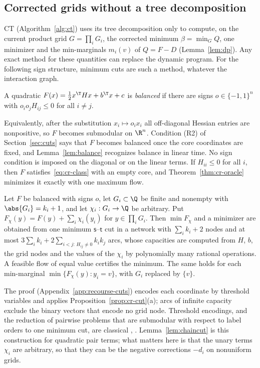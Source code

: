 \subsection{Corrected grids without a tree decomposition}\label{sec:balanced}

CT (Algorithm~\ref{alg:ct}) uses its tree decomposition only to compute, on
the current product grid $G=\prod_iG_i$, the corrected minimum
$\beta=\min_GQ$, one minimizer and the min-marginals $m_i(v)$ of $Q=F-D$
(Lemma~\ref{lem:dp}). Any exact method for these quantities can replace the
dynamic program. For the following sign structure, minimum cuts are such a
method, whatever the interaction graph.

\begin{definition}\label{def:balanced}
A quadratic $F(x)=\frac12x^{\T}Hx+b^{\T}x+c$ is \emph{balanced} if there are
signs $o\in\{-1,1\}^n$ with $o_io_jH_{ij}\le0$ for all $i\ne j$.
\end{definition}

Equivalently, after the substitution $x_i\mapsto o_ix_i$ all off-diagonal
Hessian entries are nonpositive, so $F$ becomes submodular on $\R^n$.
Condition (R2) of Section~\ref{sec:cuts} says that $F$ becomes balanced once
the core coordinates are fixed, and Lemma~\ref{lem:balance} recognizes
balance in linear time.
No sign condition is imposed on the diagonal or on the linear terms. If
$H_{ii}\le0$ for all $i$, then $F$ satisfies~\eqref{eq:cr-class} with an
empty core, and Theorem~\ref{thm:cr-oracle} minimizes it exactly with one
maximum flow.

\begin{lemma}\label{lem:chaincut}
Let $F$ be balanced with signs $o$, let $G_i\subset\Q$ be finite and
nonempty with $\abs{G_i}=k_i+1$, and let $\chi_i:G_i\to\Q$ be arbitrary. Put
$F_\chi(y)=F(y)+\sum_i\chi_i(y_i)$ for $y\in\prod_iG_i$. Then $\min F_\chi$
and a minimizer are obtained from one minimum $\mathsf s$--$\mathsf t$ cut in
a network with $\sum_ik_i+2$ nodes and at most
$3\sum_ik_i+2\sum_{i<j:\,H_{ij}\ne0}k_ik_j$ arcs, whose capacities are
computed from $H$, $b$, the grid nodes and the values of the $\chi_i$ by
polynomially many rational operations. A feasible flow of equal value
certifies the minimum. The same holds for each min-marginal
$\min\{F_\chi(y):y_i=v\}$, with $G_i$ replaced by $\{v\}$.
\end{lemma}

The proof (Appendix~\ref{app:recourse-cuts}) encodes each coordinate by
threshold variables and applies Proposition~\ref{prop:cr-cut}(a); arcs of
infinite capacity exclude the binary vectors that encode no grid node.
Threshold encodings, and the reduction of pairwise problems that are
submodular with respect to label orders to one minimum cut, are classical
\cite[Section~4]{SchlesingerFlach2006}, \cite{Ishikawa2003}.
Lemma~\ref{lem:chaincut} is this construction for quadratic pair terms; what
matters here is that the unary terms $\chi_i$ are arbitrary, so that they
can be the negative corrections $-d_i$ on nonuniform grids.

